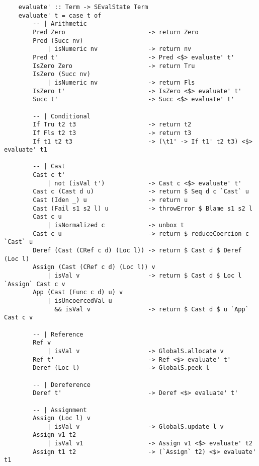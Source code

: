 \begin{lstlisting}
    evaluate' :: Term -> SEvalState Term
    evaluate' t = case t of
        -- | Arithmetic
        Pred Zero                       -> return Zero                         
        Pred (Succ nv) 
            | isNumeric nv              -> return nv                       
        Pred t'                         -> Pred <$> evaluate' t'
        IsZero Zero                     -> return Tru                        
        IsZero (Succ nv) 
            | isNumeric nv              -> return Fls                     
        IsZero t'                       -> IsZero <$> evaluate' t'
        Succ t'                         -> Succ <$> evaluate' t'

        -- | Conditional
        If Tru t2 t3                    -> return t2                        
        If Fls t2 t3                    -> return t3                         
        If t1 t2 t3                     -> (\t1' -> If t1' t2 t3) <$> evaluate' t1

        -- | Cast
        Cast c t' 
            | not (isVal t')            -> Cast c <$> evaluate' t'
        Cast c (Cast d u)               -> return $ Seq d c `Cast` u            
        Cast (Iden _) u                 -> return u                        
        Cast (Fail s1 s2 l) u           -> throwError $ Blame s1 s2 l                 
        Cast c u 
            | isNormalized c            -> unbox t                              
        Cast c u                        -> return $ reduceCoercion c `Cast` u
        Deref (Cast (CRef c d) (Loc l)) -> return $ Cast d $ Deref (Loc l)      
        Assign (Cast (CRef c d) (Loc l)) v                                                
            | isVal v                   -> return $ Cast d $ Loc l `Assign` Cast c v 
        App (Cast (Func c d) u) v 
            | isUncoercedVal u 
              && isVal v                -> return $ Cast d $ u `App` Cast c v                        

        -- | Reference
        Ref v     
            | isVal v                   -> GlobalS.allocate v                             
        Ref t'                          -> Ref <$> evaluate' t'
        Deref (Loc l)                   -> GlobalS.peek l

        -- | Dereference
        Deref t'                        -> Deref <$> evaluate' t'
                                            
        -- | Assignment
        Assign (Loc l) v
            | isVal v                   -> GlobalS.update l v                       
        Assign v1 t2 
            | isVal v1                  -> Assign v1 <$> evaluate' t2
        Assign t1 t2                    -> (`Assign` t2) <$> evaluate' t1


\end{lstlisting}
